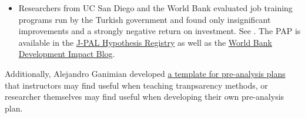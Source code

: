 \documentclass[12pt] {article}
\begin{document}
\begin{itemize}
\item
Researchers from UC San Diego and the World Bank evaluated job training programs run by the Turkish government and found only insignificant improvements and a strongly negative return on investment. See \cite{almeida_impact_2012, vocationalTurkey}. The PAP is available in the \href{http://www.povertyactionlab.org/Hypothesis-Registry}{J-PAL Hypothesis Registry} as well as the \href{http://blogs.worldbank.org/impactevaluations/files/impactevaluations/iskurie_analysisplan_v4a.pdf}{World Bank Development Impact Blog}.





\end{itemize}

Additionally, Alejandro Ganimian developed \href{http://scholar.harvard.edu/files/alejandro_ganimian/files/pre-analysis_plan_template_0.pdf}{a template for pre-analysis plans} that instructors may find useful when teaching tranpsarency methods, or researcher themselves may find useful when developing their own pre-analysis plan.
\end{document}
